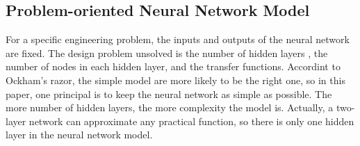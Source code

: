 \documentclass[smallextended]{svjour3}       %
\begin{document}
\begin{multicols}{2}

\section{Problem-oriented Neural Network Model}
For a specific engineering problem, the inputs and outputs of the neural
network are fixed. The design problem unsolved is the number of hidden layers ,
the number of nodes in each hidden layer, and the transfer functions. Accordint to
Ockham's razor, the simple model are more likely to be the right one, so in this
paper, one principal is to keep the neural network as simple as possible. The
more number of hidden layers, the more complexity the model is. Actually, a
two-layer network can approximate any practical function, so there is only one
hidden layer in the neural network model.



\end{multicols}
\end{document}
